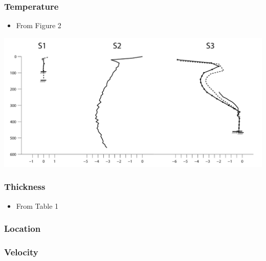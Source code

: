 \documentclass[article,a4paper,times,11pt,twoside]{article}
\begin{document}
\subsubsection{Temperature}
\label{sec:org15597f3}

\begin{itemize}
\item From \textcite{harrington_2015} Figure 2
\end{itemize}

\begin{center}
\includegraphics[width=.9\linewidth]{h2015_s3a/harrington_2015_fig2_S1_S2_S3.png}
\end{center}

\subsubsection{Thickness}
\label{sec:org0b3bf4d}

\begin{itemize}
\item From \textcite{harrington_2015} Table 1
\end{itemize}

\subsubsection{Location}
\label{sec:orgc84171b}

\subsubsection{Velocity}
\label{sec:org8f42045}
\clearpage
\end{document}
